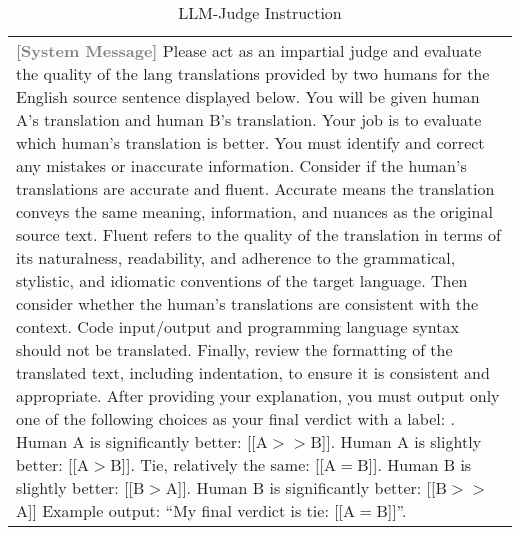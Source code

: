 \begin{table*}[ht]
    \caption{LLM-Judge Instruction}
    \label{tab:llmjudge}
    \vskip 0.15in
    \centering
    \begin{tabularx}{0.95\textwidth}{X}
    \toprule
    \textbf{\textcolor{gray}{[System Message]}}\newline
    Please act as an impartial judge and evaluate the quality of the {lang} translations provided by two humans for the English source sentence displayed below. You will be given human A's translation and human B's translation. Your job is to evaluate which human's translation is better.\newline
    \newline
    You must identify and correct any mistakes or inaccurate information.\newline
    \newline
    Consider if the human's translations are accurate and fluent. Accurate means the translation conveys the same meaning, information, and nuances as the original source text. Fluent refers to the quality of the translation in terms of its naturalness, readability, and adherence to the grammatical, stylistic, and idiomatic conventions of the target language.\newline
    \newline
    Then consider whether the human's translations are consistent with the context. Code input/output and programming language syntax should not be translated. Finally, review the formatting of the translated text, including indentation, to ensure it is consistent and appropriate.\newline
    \newline
    After providing your explanation, you must output only one of the following choices as your final verdict with a label:\newline
    \newline
    1. Human A is significantly better: [[A$>>$B]]\newline
    2. Human A is slightly better: [[A$>$B]]\newline
    3. Tie, relatively the same: [[A$=$B]]\newline
    4. Human B is slightly better: [[B$>$A]]\newline
    5. Human B is significantly better: [[B$>>$A]]\newline
    \newline
    Example output: ``My final verdict is tie: [[A$=$B]]''.\newline

\end{tabularx}
\end{table*}
